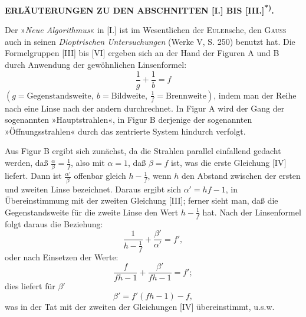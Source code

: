 \clearpage\begingroup
{}
\begin{center}
\textbf{ERLÄUTERUNGEN ZU DEN ABSCHNITTEN [I.] BIS [III.]\textsuperscript{*)}.}\par\medskip
{}
\end{center}
\begingroup\renewcommand{\thefootnote}{}\endgroup
\noindent\hspace*{\parindent}Der »\textit{Neue Algorithmus}« in [I.] ist im Wesentlichen der \textsc{Euler}sche, den \textsc{Gauss} auch in seinen \textit{Dioptrischen Untersuchungen} (Werke V, S. 250) benutzt hat. Die Formelgruppen [III] bis [VI] ergeben sich an der Hand der Figuren A und B durch Anwendung der gewöhnlichen Linsenformel:
\[
\frac1g+\frac1b=f
\]
\noindent $\left(g=\text{Gegenstandsweite},\ b=\text{Bildweite},\ \frac1f=\text{Brennweite}\right)$, indem man der Reihe nach eine Linse nach der andern durchrechnet. In Figur A wird der Gang der sogenannten »Hauptstrahlen«, in Figur B derjenige der sogenannten »Öffnungsstrahlen« durch das zentrierte System hindurch verfolgt.

Aus Figur B ergibt sich zunächst, da die Strahlen parallel einfallend gedacht werden, daß $\frac\alpha\beta=\frac1f$, also mit $\alpha=1$, daß $\beta=f$ ist, was die erste Gleichung [IV] liefert. Dann ist $\frac{\alpha'}\beta$ offenbar gleich $h-\frac1f$, wenn $h$ den Abstand zwischen der ersten und zweiten Linse bezeichnet. Daraus ergibt sich $\alpha'=hf-1$, in Übereinstimmung mit der zweiten Gleichung [III]; ferner sieht man, daß die Gegenstandsweite für die zweite Linse den Wert $h-\frac1f$ hat. Nach der Linsenformel folgt daraus die Beziehung:
\[
\frac1{h-\frac1f}+\frac{\beta'}{\alpha'}=f',
\]
\clearpage{}
\noindent oder nach Einsetzen der Werte:
\[
\frac f{fh-1}+\frac{\beta'}{fh-1}=f';
\]
\noindent dies liefert für $\beta'$
\[
\beta'=f'(fh-1)-f,
\]
\noindent was in der Tat mit der zweiten der Gleichungen [IV] übereinstimmt, u.s.w.

